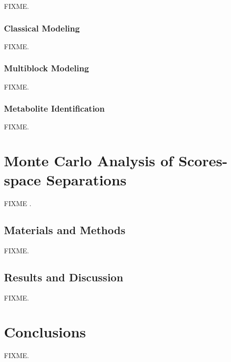 \begin{doublespace}
FIXME.
\end{doublespace}

\subsubsection{Classical Modeling}

\begin{doublespace}
FIXME.
\end{doublespace}

\subsubsection{Multiblock Modeling}

\begin{doublespace}
FIXME.
\end{doublespace}

\subsubsection{Metabolite Identification}

\begin{doublespace}
FIXME.
\end{doublespace}

\section{Monte Carlo Analysis of Scores-space Separations}

\begin{doublespace}
FIXME \cite{worley:anchem2015}.
\end{doublespace}

\subsection{Materials and Methods}

\begin{doublespace}
FIXME.
\end{doublespace}

\subsection{Results and Discussion}

\begin{doublespace}
FIXME.
\end{doublespace}

\section{Conclusions}

\begin{doublespace}
FIXME.
\end{doublespace}




